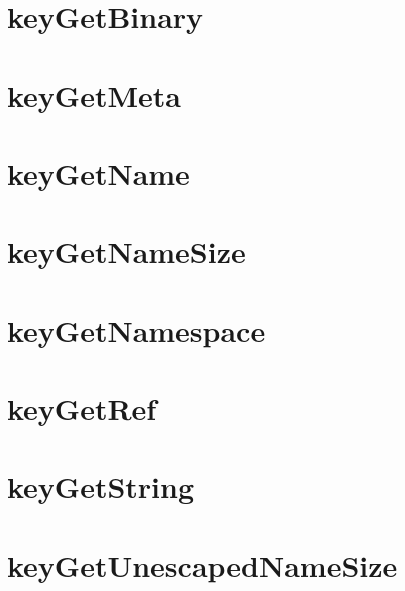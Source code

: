 \let\mypdfximage\pdfximage\def\pdfximage{\immediate\mypdfximage}\documentclass[twoside]{book}
\newcommand{\+}{\discretionary{\mbox{\scriptsize$\hookleftarrow$}}{}{}}
\begin{document}
\chapter{key\+Get\+Binary}
\label{doc_api_review_core_keyGetBinary_md}

\chapter{key\+Get\+Meta}
\label{doc_api_review_core_keyGetMeta_md}

\chapter{key\+Get\+Name}
\label{doc_api_review_core_keyGetName_md}

\chapter{key\+Get\+Name\+Size}
\label{doc_api_review_core_keyGetNameSize_md}

\chapter{key\+Get\+Namespace}
\label{doc_api_review_core_keyGetNamespace_md}

\chapter{key\+Get\+Ref}
\label{doc_api_review_core_keyGetRef_md}

\chapter{key\+Get\+String}
\label{doc_api_review_core_keyGetString_md}

\chapter{key\+Get\+Unescaped\+Name\+Size}
\label{doc_api_review_core_keyGetUnescapedNameSize_md}

\end{document}
